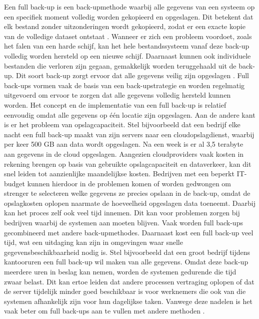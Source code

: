 Een full back-up is een back-upmethode waarbij alle gegevens van een systeem op een specifiek moment volledig worden gekopieerd en opgeslagen. Dit betekent dat elk bestand zonder uitzonderingen wordt gekopieerd, zodat er een exacte kopie van de volledige dataset ontstaat \autocite{Beard2018}. Wanneer er zich een probleem voordoet, zoals het falen van een harde schijf, kan het hele bestandssysteem vanaf deze back-up volledig worden hersteld op een nieuwe schijf. Daarnaast kunnen ook individuele bestanden die verloren zijn gegaan, gemakkelijk worden teruggehaald uit de back-up. Dit soort back-up zorgt ervoor dat alle gegevens veilig zijn opgeslagen \autocite{Chervenak1998}. Full back-ups vormen vaak de basis van een back-upstrategie en worden regelmatig uitgevoerd om ervoor te zorgen dat alle gegevens volledig hersteld kunnen worden. Het concept en de implementatie van een full back-up is relatief eenvoudig omdat alle gegevens op één locatie zijn opgeslagen. Aan de andere kant is er het probleem van opslagcapaciteit. Stel bijvoorbeeld dat een bedrijf elke nacht een full back-up maakt van zijn servers naar een cloudopslagdienst, waarbij per keer 500 GB aan data wordt opgeslagen. Na een week is er al 3,5 terabyte aan gegevens in de cloud opgeslagen. Aangezien cloudproviders vaak kosten in rekening brengen op basis van gebruikte opslagcapaciteit en dataverkeer, kan dit snel leiden tot aanzienlijke maandelijkse kosten. Bedrijven met een beperkt IT-budget kunnen hierdoor in de problemen komen of worden gedwongen om strenger te selecteren welke gegevens ze precies opslaan in de back-up, omdat de opslagkosten oplopen naarmate de hoeveelheid opgeslagen data toeneemt. Daarbij kan het proces zelf ook veel tijd innemen. Dit kan voor problemen zorgen bij bedrijven waarbij de systemen aan moeten blijven. Vaak worden full back-ups gecombineerd met andere back-upmethodes. Daarnaast kost een full back-up veel tijd, wat een uitdaging kan zijn in omgevingen waar snelle gegevensbeschikbaarheid nodig is. Stel bijvoorbeeld dat een groot bedrijf tijdens kantooruren een full back-up wil maken van alle gegevens. Omdat deze back-up meerdere uren in beslag kan nemen, worden de systemen gedurende die tijd zwaar belast. Dit kan ertoe leiden dat andere processen vertraging oplopen of dat de server tijdelijk minder goed beschikbaar is voor werknemers die ook van die systemen afhankelijk zijn voor hun dagelijkse taken. Vanwege deze nadelen is het vaak beter om full back-ups aan te vullen met andere methoden \autocite{Nelson2011}.

